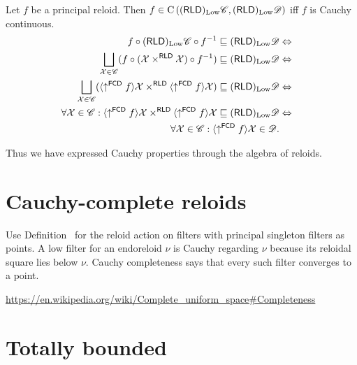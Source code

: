 \begin{prop}
  Let $f$ be a principal reloid. Then $f \in \mathrm{C} \left( 
  (\mathsf{RLD})_{\operatorname{Low}} \mathscr{C} ,
  (\mathsf{RLD})_{\operatorname{Low}} \mathscr{D} \right)$ iff $f$ is Cauchy
  continuous.
  \begin{eqnarray*}
    f \circ (\mathsf{RLD})_{\Low} \mathscr{C} \circ f^{- 1}
    \sqsubseteq (\mathsf{RLD})_{\Low} \mathscr{D} &
    \Leftrightarrow & \\
    \bigsqcup_{\mathcal{X} \in
    \mathscr{C}} (f \circ (\mathcal{X} \times^{\mathsf{RLD}}
    \mathcal{X} ) \circ f^{- 1} ) \sqsubseteq (\mathsf{RLD})_{\Low}
    \mathscr{D} & \Leftrightarrow & \\
    \bigsqcup_{\mathcal{X} \in \mathscr{C}} ( \langle \uparrow^{\mathsf{FCD}} f \rangle
    \mathcal{X} \times^{\mathsf{RLD}} \langle
    \uparrow^{\mathsf{FCD}} f \rangle \mathcal{X}) \sqsubseteq
    (\mathsf{RLD})_{\Low} \mathscr{D} & \Leftrightarrow & \\
    \forall \mathcal{X} \in \mathscr{C} : \langle
    \uparrow^{\mathsf{FCD}} f \rangle \mathcal{X}
    \times^{\mathsf{RLD}} \langle \uparrow^{\mathsf{FCD}} f
    \rangle \mathcal{X} \sqsubseteq (\mathsf{RLD})_{\Low}
    \mathscr{D} & \Leftrightarrow & \\
    \forall \mathcal{X} \in \mathscr{C} : \langle
    \uparrow^{\mathsf{FCD}} f \rangle \mathcal{X} \in \mathscr{D} . & 
    & 
  \end{eqnarray*}
\end{prop}

Thus we have expressed Cauchy properties through the algebra of reloids.

\section{Cauchy-complete reloids}

Use Definition~ for the reloid action
on filters with principal singleton filters as points. A low
filter for an endoreloid $\nu$ is Cauchy regarding $\nu$ because
its reloidal square lies below $\nu$. Cauchy completeness says
that every such filter converges to a point.

\url{https://en.wikipedia.org/wiki/Complete\_uniform\_space\#Completeness}

\section{Totally bounded}

